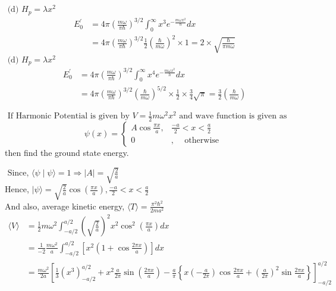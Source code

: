 \begin{enumerate}
\begin{answer}
$\text { (d) } H_{p}=\lambda x^{2}$
\begin{align*}
E_{0}^{\prime}&=4 \pi\left(\frac{m \omega}{\pi \hbar}\right)^{3 / 2} \int_{0}^{\infty} x^{3} e^{-\frac{m \omega x^{2}}{\hbar}} d x\\
&=4 \pi\left(\frac{m \omega}{\pi \hbar}\right)^{3 / 2} \frac{1}{2}\left(\frac{\hbar}{m \omega}\right)^{2} \times 1=2 \times \sqrt{\frac{\hbar}{\pi m \omega}}
\end{align*}
$\text { (d) } H_{p}=\lambda x^{2}$\\
\begin{align*}
E_{0}^{\prime}&=4 \pi\left(\frac{m \omega}{\pi \hbar}\right)^{3 / 2} \int_{0}^{\infty} x^{4} e^{-\frac{m \omega x^{2}}{h}} d x\\
&=4 \pi\left(\frac{m \omega}{\pi \hbar}\right)^{3 / 2}\left(\frac{\hbar}{m \omega}\right)^{5 / 2} \times \frac{1}{2} \times \frac{3}{4} \sqrt{\pi}=\frac{3}{2}\left(\frac{\hbar}{m \omega}\right)
\end{align*}
\end{answer}
	\begin{minipage}{\textwidth}
	\item $\text { If Harmonic Potential is given by } V=\frac{1}{2} m \omega^{2} x^{2} \text { and wave function is given as }$\\
	$$
	\psi(x)= \begin{cases}A \cos \frac{\pi x}{a}, & \frac{-a}{2}<x<\frac{a}{2} \\ 0 & , \quad \text { otherwise }\end{cases}
	$$
	then find the ground state energy.
\end{minipage}
\begin{answer}
$\text { Since, }\langle\psi \mid \psi\rangle=1 \Rightarrow|A|=\sqrt{\frac{2}{a}}$\\
Hence, $|\psi\rangle=\sqrt{\frac{2}{a}} \cos \left(\frac{\pi x}{a}\right), \frac{-a}{2}<x<\frac{a}{2}$\\
And also, average kinetic energy, $\langle T\rangle=\frac{\pi^{2} \hbar^{2}}{2 m a^{2}}$	\\
\begin{align*}
\langle V\rangle&=\frac{1}{2} m \omega^{2} \int_{-a / 2}^{a / 2}\left(\sqrt{\frac{2}{a}}\right)^{2} x^{2} \cos ^{2}\left(\frac{\pi x}{a}\right) d x\\
&=\frac{1}{-2} \frac{m \omega^{2}}{a} \int_{-a / 2}^{a / 2}\left[x^{2}\left(1+\cos \frac{2 \pi x}{a}\right)\right] d x\\
&=\frac{m \omega^{2}}{2 a}\left[\frac{1}{3}\left(x^{3}\right)_{-a / 2}^{a / 2}+x^{2} \frac{a}{2 \pi} \sin \left(\frac{2 \pi x}{a}\right)-\frac{a}{\pi}\left\{x\left(-\frac{a}{2 \pi}\right) \cos \frac{2 \pi x}{a}+\left(\frac{a}{2 \pi}\right)^{2} \sin \frac{2 \pi x}{a}\right\}\right]_{-a / 2}^{a / 2}\\

\end{align*}
\end{answer}
\end{enumerate}
